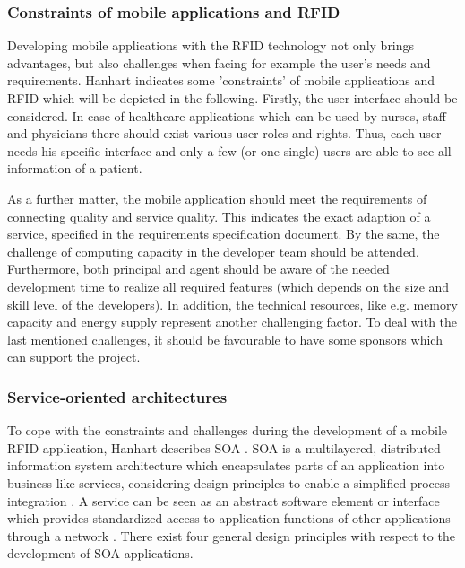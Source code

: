 \subsubsection{Constraints of mobile applications and RFID}

Developing mobile applications with the RFID technology not only brings advantages, but also challenges when facing for example the user's needs and requirements. Hanhart indicates some 'constraints' of mobile applications and RFID \cite[p.16 ff.]{mobile} which will be depicted in the following. Firstly, the user interface should be considered. In case of healthcare applications which can be used by nurses, staff and physicians there should exist various user roles and rights. Thus, each user needs his specific interface and only a few (or one single) users are able to see all information of a patient. 

As a further matter, the mobile application should meet the requirements of connecting quality and service quality. This indicates the exact adaption of a service, specified in the requirements specification document. By the same, the challenge of computing capacity in the developer team should be attended. Furthermore, both principal and agent should be aware of the needed development time to realize all required features (which depends on the size and skill level of the developers). In addition, the technical resources, like e.g. memory capacity and energy supply represent another challenging factor. To deal with the last mentioned challenges, it should be favourable to have some sponsors which can support the project.

\subsubsection{Service-oriented architectures}

To cope with the constraints and challenges during the development of a mobile RFID application, Hanhart describes \ac{SOA} \cite[p.31 ff.]{mobile}. SOA is a multilayered, distributed information system architecture which encapsulates parts of an application into business-like services, considering design principles to enable a simplified process integration \cite[p.32]{mobile}. A service can be seen as an abstract software element or interface which provides standardized access to application functions of other applications through a network \cite[p.32]{mobile}. There exist four general design principles with respect to the development of SOA applications. 

